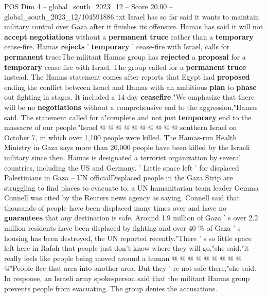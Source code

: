 \begin{textsample}{POS Dim 4 – global\_south\_2023\_12 – Score 20.00 – global\_south\_2023\_12/104591886.txt}
Israel has so far said it wants to maintain military control over Gaza after it finishes its offensive.
Hamas has said it will not \textbf{accept} \textbf{negotiations} without a \textbf{permanent} \textbf{truce} rather than a \textbf{temporary} cease-fire.
Hamas \textbf{rejects} ' \textbf{temporary} ' cease-fire with Israel, calls for \textbf{permanent} truceThe militant Hamas group has \textbf{rejected} a \textbf{proposal} for a \textbf{temporary} cease-fire with Israel.
The group called for a \textbf{permanent} \textbf{truce} instead.
The Hamas statement comes after reports that Egypt had \textbf{proposed} ending the conflict between Israel and Hamas with an ambitious \textbf{plan} to \textbf{phase} out fighting in stages.
It included a 14-day \textbf{ceasefire}."We emphasize that there will be no \textbf{negotiations} without a comprehensive end to the aggression,"Hamas said.
The statement called for a"complete and not just \textbf{temporary} end to the massacre of our people."Israel @ @ @ @ @ @ @ @ @ @ southern Israel on October 7, in which over 1,100 people were killed.
The Hamas-run Health Ministry in Gaza says more than 20,000 people have been killed by the Israeli military since then.
Hamas is designated a terrorist organization by several countries, including the US and Germany. ' Little space left ' for displaced Palestinians in Gaza -- UN officialDisplaced people in the Gaza Strip are struggling to find places to evacuate to, a UN humanitarian team leader Gemma Connell was cited by the Reuters news agency as saying.
Connell said that thousands of people have been displaced many times over and have no \textbf{guarantees} that any destination is safe.
Around 1.9 million of Gaza ' s over 2.2 million residents have been displaced by fighting and over 40 \% of Gaza ' s housing has been destroyed, the UN reported recently."There ' s so little space left here in Rafah that people just don't know where they will go,"she said."it really feels like people being moved around a human @ @ @ @ @ @ @ @ @ @"People flee that area into another area.
But they ' re not safe there,"she said.
In response, an Israeli army spokesperson said that the militant Hamas group prevents people from evacuating.
The group denies the accusations.

\end{textsample}
